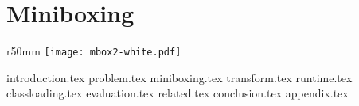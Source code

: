 \chapter{Miniboxing}
\label{chapter:miniboxing}

\begin{wrapfigure}{r}{50mm}
  \centering
  \vspace{-30em}
  \texttt{[image: mbox2-white.pdf]}
  \vspace{-30em}
\end{wrapfigure}

{introduction.tex}
{problem.tex}
{miniboxing.tex}
{transform.tex}
{runtime.tex}
{classloading.tex}
{evaluation.tex}
{related.tex}
{conclusion.tex}
{appendix.tex}

